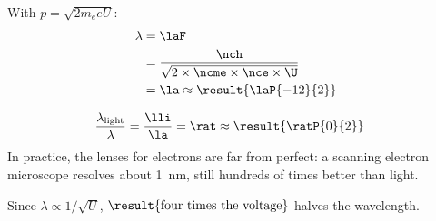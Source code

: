 \begin{abcliste}
\abc With $p = \sqrt{2 m_e e U}$:
\begin{align}
 \lambda &= \laF \\
   &= \frac{\nch}{\sqrt{2\times\ncme\times\nce\times\U}} \\
   &= \la \approx \result{\laP{-12}{2}}
\end{align}

\abc
\begin{align}
 \frac{\lambda_\text{light}}{\lambda} &= \frac{\lli}{\la} = \rat \approx \result{\ratP{0}{2}}
\end{align}
In practice, the lenses for electrons are far from perfect: a scanning electron microscope resolves about \SI{1}{\nano\m}, still hundreds of times better than light.

\abc Since $\lambda\propto 1/\sqrt{U}$, $\result{\text{four times the voltage}}$ halves the wavelength.
\end{abcliste}
